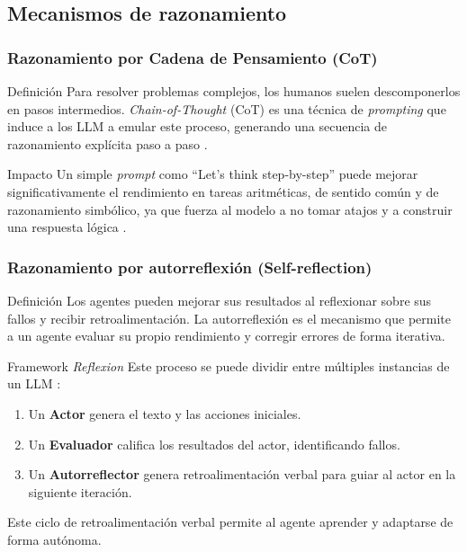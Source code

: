\documentclass[handout]{beamer}
\begin{document}
\subsection{Mecanismos de razonamiento}
\begin{frame}
  \frametitle{Razonamiento por Cadena de Pensamiento (CoT)}
  \begin{block}{Definición}
    Para resolver problemas complejos, los humanos suelen descomponerlos en pasos intermedios. \textit{Chain-of-Thought} (CoT) es una técnica de \textit{prompting} que induce a los LLM a emular este proceso, generando una secuencia de razonamiento explícita paso a paso \parencite{wei2022chain}.
  \end{block}
  \begin{exampleblock}{Impacto}
    Un simple \textit{prompt} como ``Let's think step-by-step'' puede mejorar significativamente el rendimiento en tareas aritméticas, de sentido común y de razonamiento simbólico, ya que fuerza al modelo a no tomar atajos y a construir una respuesta lógica \parencite[citado en][]{plaat2025agenticlargelanguagemodels}.
  \end{exampleblock}
\end{frame}

\begin{frame}
  \frametitle{Razonamiento por autorreflexión (Self-reflection)}
    \begin{block}{Definición}
    Los agentes pueden mejorar sus resultados al reflexionar sobre sus fallos y recibir retroalimentación. La autorreflexión es el mecanismo que permite a un agente evaluar su propio rendimiento y corregir errores de forma iterativa.
    \end{block}
    \begin{alertblock}{Framework \textit{Reflexion}}
    Este proceso se puede dividir entre múltiples instancias de un LLM \parencite{shinn2024re}:
    \begin{enumerate}
        \item Un \textbf{Actor} genera el texto y las acciones iniciales.
        \item Un \textbf{Evaluador} califica los resultados del actor, identificando fallos.
        \item Un \textbf{Autorreflector} genera retroalimentación verbal para guiar al actor en la siguiente iteración.
    \end{enumerate}
    Este ciclo de retroalimentación verbal permite al agente aprender y adaptarse de forma autónoma.
    \end{alertblock}
\end{frame}
\end{document}
